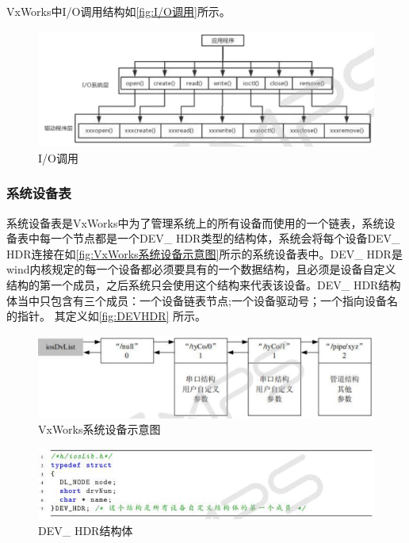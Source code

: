 	VxWorks中I/O调用结构如\autoref{fig:I/O调用}所示。
	\begin{figure}[!h]
\centering
\includegraphics[width=1.0\textwidth]{./graphics/IOCall.pdf}
\caption{I/O调用}\label{fig:I/O调用}
\end{figure}

	
\subsubsection{系统设备表}
	系统设备表是VxWorks中为了管理系统上的所有设备而使用的一个链表，系统设备表中每一个节点都是一个DEV\_ HDR类型的结构体，系统会将每个设备DEV\_ HDR连接在如\autoref{fig:VxWorks系统设备示意图}所示的系统设备表中。DEV\_ HDR是wind内核规定的每一个设备都必须要具有的一个数据结构，且必须是设备自定义结构的第一个成员，之后系统只会使用这个结构来代表该设备。DEV\_ HDR结构体当中只包含有三个成员：一个设备链表节点;一个设备驱动号；一个指向设备名的指针。
	其定义如\autoref{fig:DEVHDR} 所示。

\begin{figure}[!h]
\centering
\includegraphics[width=1.0\textwidth]{./graphics/vxworks-device-link.pdf}
\caption{VxWorks系统设备示意图}\label{fig:VxWorks系统设备示意图}
\end{figure}
	
\begin{figure}[!h]
\centering
\includegraphics[width=1.0\textwidth]{./graphics/DEVHDR.pdf}
\caption{DEV\_ HDR结构体}\label{fig:DEVHDR}
\end{figure}

